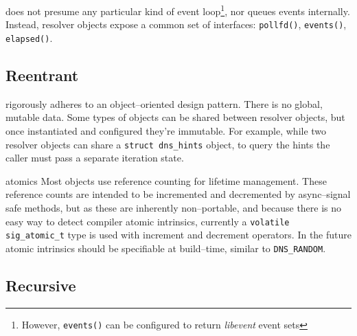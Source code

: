 \documentclass[11pt]{article}
\begin{document}
\dnsc does not presume any particular kind of event loop\footnote{However,
\texttt{events()} can be configured to return \textit{libevent} event sets},
nor queues events internally. Instead, resolver objects expose a common set
of interfaces: \texttt{pollfd()}, \texttt{events()}, \texttt{elapsed()}.

\subsection{Reentrant}

\dnsc rigorously adheres to an object--oriented design pattern. There is no
global, mutable data. Some types of objects can be shared between resolver
objects, but once instantiated and configured they're immutable. For
example, while two resolver objects can share a \texttt{struct dns\_hints}
object, to query the hints the caller must pass a separate iteration state.

\hfill

\begin{todo}{atomics}
Most objects use reference counting for
lifetime management. These reference counts are intended to be incremented
and decremented by async--signal safe methods, but as these are inherently
non--portable, and because there is no easy way to detect compiler atomic
intrinsics, currently a \texttt{volatile sig\_atomic\_t} type is used with
increment and decrement operators. In the future atomic intrinsics should be
specifiable at build--time, similar to \texttt{DNS\_RANDOM}.
\end{todo}


\subsection{Recursive}
\end{document}

